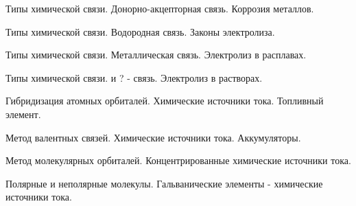 \documentclass[
	14pt,
	a4paper,
	]
	{scrartcl}
\begin{document}
\vfill
\z Типы химической связи. Донорно-акцепторная связь.
 \vfill
\z Коррозия металлов.
 \vfill

\vfill

\newpage


\shapk
{}
\setcounter{zad}{0}

\vfill
\z Типы химической связи. Водородная связь.
 \vfill
\z Законы электролиза.
 \vfill

\vfill

\newpage


\shapk
{}
\setcounter{zad}{0}

\vfill
\z Типы химической связи. Металлическая связь.
 \vfill
\z Электролиз в расплавах.
 \vfill

\vfill

\newpage


\shapk
{}
\setcounter{zad}{0}

\vfill
\z Типы химической связи.   и ? - связь.
 \vfill
\z Электролиз в растворах.
 \vfill

\vfill

\newpage


\shapk
{}
\setcounter{zad}{0}

\vfill
\z Гибридизация атомных орбиталей.
 \vfill
\z Химические источники тока. Топливный элемент.
 \vfill

\vfill

\newpage


\shapk
{}
\setcounter{zad}{0}

\vfill
\z Метод валентных связей.
 \vfill
\z Химические источники тока. Аккумуляторы.
 \vfill

\vfill

\newpage


\shapk
{}
\setcounter{zad}{0}

\vfill
\z Метод молекулярных орбиталей.
 \vfill
\z Концентрированные химические источники тока.
 \vfill

\vfill

\newpage


\shapk
{}
\setcounter{zad}{0}

\vfill
\z Полярные и неполярные молекулы.
 \vfill
\z Гальванические элементы - химические источники тока.
 \vfill

\vfill

\newpage
\end{document}
